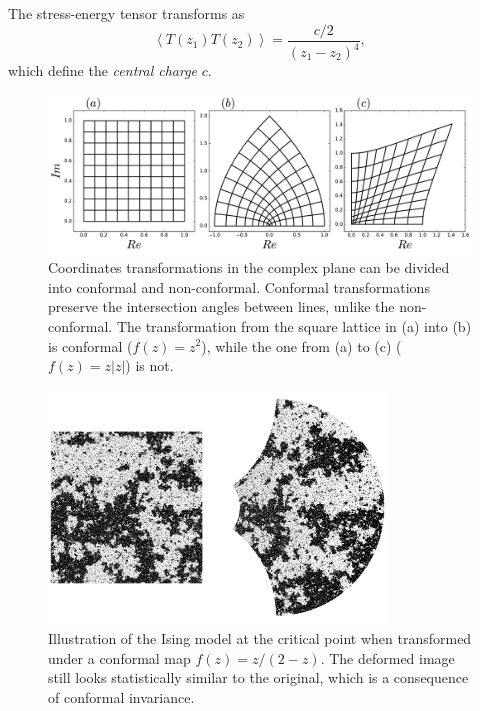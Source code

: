 The stress-energy tensor transforms as
\begin{equation}
    \left\langle T\left(z_{1}\right)T\left(z_{2}\right)\right\rangle=
    \frac{c/2}{{\left(z_{1}-z_{2}\right)}^{4}},
\end{equation}
which define the \textit{central charge} $c$.


\begin{figure}
\begin{center}
    \includegraphics[width=\textwidth]{chapters/ch3-conf/figs/cmapex}
\end{center}
\caption{Coordinates transformations in the complex plane can be divided into
    conformal and non-conformal. Conformal transformations preserve the
    intersection angles between lines, unlike the non-conformal. The
    transformation from the square lattice in (a) into (b) is conformal
    ($f(z)=z^2$), while the one from (a) to (c) ($f(z)=z|z|$) is not.}
\label{fig:cmapex}
\end{figure}


\begin{figure}
\begin{center}
    \includegraphics[width=0.8\textwidth]{chapters/ch3-conf/figs/isingcm}
\end{center}
\caption{Illustration of the Ising model at the critical point when transformed
    under a conformal map $f(z)=z/(2-z)$. The deformed image still looks
    statistically similar to the original, which is a consequence of conformal
    invariance.}
\label{fig:isingcm}
\end{figure}

